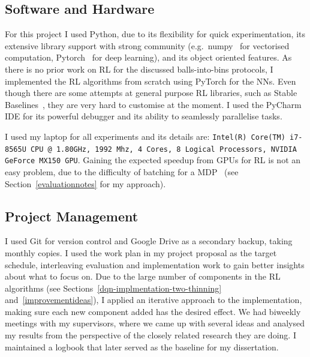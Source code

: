 \subsection{Software and Hardware} \label{software-and-hardware}


For this project I used Python, due to its flexibility for quick experimentation, its extensive library support with strong community (e.g.\ numpy~\cite{harris2020numpy} for vectorised computation, Pytorch~\cite{paszke2019pytorch} for deep learning), and its object oriented features. As there is no prior work on RL for the discussed balls-into-bins protocols, I implemented the RL algorithms from scratch using PyTorch for the NNs. Even though there are some attempts at general purpose RL libraries, such as Stable Baselines~\cite{hill2018stablebaselines}, they are very hard to customise at the moment. I used the PyCharm IDE for its powerful debugger and its ability to seamlessly parallelise tasks.


I used my laptop for all experiments and its details are: \texttt{Intel(R) Core(TM) i7-8565U CPU @ 1.80GHz, 1992 Mhz, 4 Cores, 8 Logical Processors, NVIDIA GeForce MX150 GPU}. Gaining the expected speedup from GPUs for RL is not an easy problem, due to the difficulty of batching for a MDP~\cite{stooke2018gpudeepRL} (see Section~\ref{evaluationnotes} for my approach).


\subsection{Project Management}

I used Git for version control and Google Drive as a secondary backup, taking monthly copies. I used the work plan in my project proposal as the target schedule, interleaving evaluation and implementation work to gain better insights about what to focus on. Due to the large number of components in the RL algorithms (see Sections~\ref{dqn-implmentation-two-thinning} and~\ref{improvementideas}), I applied an iterative approach to the implementation, making sure each new component added has the desired effect. We had biweekly meetings with my supervisors, where we came up with several ideas and analysed my results from the perspective of the closely related research they are doing. I maintained a logbook that later served as the baseline for my dissertation.